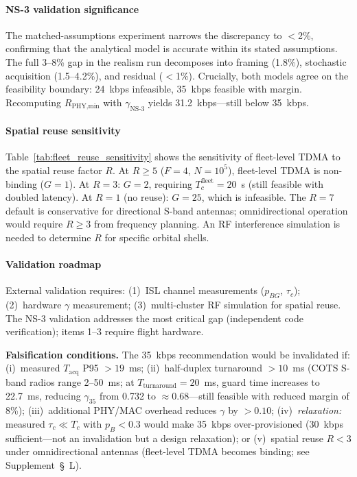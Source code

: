 \documentclass[journal]{IEEEtran}
\begin{document}
\paragraph{NS-3 validation significance}
The matched-assumptions experiment narrows the discrepancy to $<$2\%, confirming that the analytical model is accurate within its stated assumptions. The full 3--8\% gap in the realism run decomposes into framing (1.8\%), stochastic acquisition (1.5--4.2\%), and residual ($<$1\%). Crucially, both models agree on the feasibility boundary: 24~kbps infeasible, 35~kbps feasible with margin. Recomputing $R_{\text{PHY,min}}$ with $\gamma_{\text{NS-3}}$ yields 31.2~kbps---still below 35~kbps.

\paragraph{Spatial reuse sensitivity}
Table~\ref{tab:fleet_reuse_sensitivity} shows the sensitivity of fleet-level TDMA to the spatial reuse factor $R$. At $R \geq 5$ ($F{=}4$, $N{=}10^5$), fleet-level TDMA is non-binding ($G{=}1$). At $R{=}3$: $G{=}2$, requiring $T_c^{\text{fleet}}{=}20$~s (still feasible with doubled latency). At $R{=}1$ (no reuse): $G{=}25$, which is infeasible. The $R{=}7$ default is conservative for directional S-band antennas; omnidirectional operation would require $R \geq 3$ from frequency planning. An RF interference simulation is needed to determine $R$ for specific orbital shells.

\paragraph{Validation roadmap}
External validation requires: (1)~ISL channel measurements ($p_{BG}$, $\tau_c$); (2)~hardware $\gamma$ measurement; (3)~multi-cluster RF simulation for spatial reuse. The NS-3 validation addresses the most critical gap (independent code verification); items 1--3 require flight hardware.

\textbf{Falsification conditions.} The 35~kbps recommendation would be invalidated if: (i)~measured $T_{\text{acq}}$ P95 $> 19$~ms; (ii)~half-duplex turnaround $> 10$~ms (COTS S-band radios range 2--50~ms; at $T_{\text{turnaround}} = 20$~ms, guard time increases to 22.7~ms, reducing $\gamma_{35}$ from 0.732 to ${\approx}0.68$---still feasible with reduced margin of 8\%); (iii)~additional PHY/MAC overhead reduces $\gamma$ by $> 0.10$; (iv)~\emph{relaxation:} measured $\tau_c \ll T_c$ with $p_B < 0.3$ would make 35~kbps over-provisioned (30~kbps sufficient---not an invalidation but a design relaxation); or (v)~spatial reuse $R < 3$ under omnidirectional antennas (fleet-level TDMA becomes binding; see Supplement~\S~L).
\end{document}
